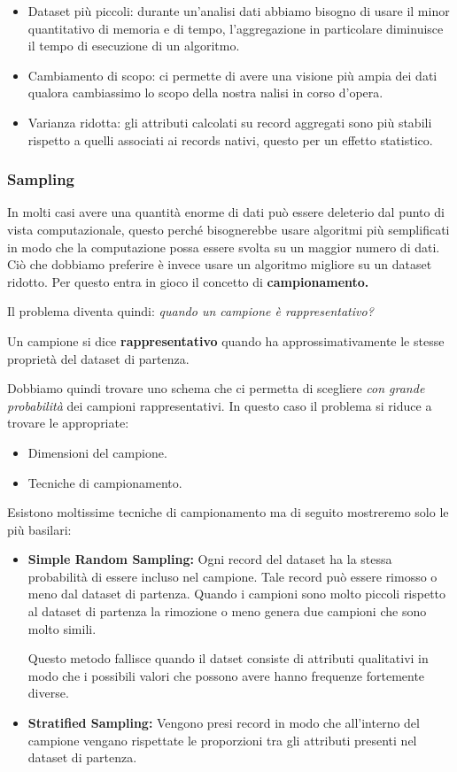 \begin{itemize}
	\item Dataset più piccoli: durante un'analisi dati abbiamo bisogno di usare il minor quantitativo di memoria e di tempo, l'aggregazione in particolare diminuisce il tempo di esecuzione di un algoritmo.
	\item Cambiamento di scopo: ci permette di avere una visione più ampia dei dati qualora cambiassimo lo scopo della nostra nalisi in corso d'opera.
	\item Varianza ridotta: gli attributi calcolati su record aggregati sono più stabili rispetto a quelli associati ai records nativi, questo per un effetto statistico.
\end{itemize}


\subsubsection{Sampling}
In molti casi avere una quantità enorme di dati può essere deleterio dal punto di vista computazionale, questo perché bisognerebbe usare algoritmi più semplificati in modo che la computazione possa essere svolta su un maggior numero di dati. Ciò che dobbiamo preferire è invece usare un algoritmo migliore su un dataset ridotto. Per questo entra in gioco il concetto di \textbf{campionamento.}

Il problema diventa quindi: \textit{quando un campione è rappresentativo?}

\begin{defn}
	Un campione si dice \textbf{rappresentativo} quando ha approssimativamente le stesse proprietà del dataset di partenza.

\end{defn}

Dobbiamo quindi trovare uno schema che ci permetta di scegliere \textit{con grande probabilità} dei campioni rappresentativi. In questo caso il problema si riduce a trovare le appropriate:
\begin{itemize}
	\item Dimensioni del campione.
	\item Tecniche di campionamento.
\end{itemize}
Esistono moltissime tecniche di campionamento ma di seguito  mostreremo solo le più basilari:

\begin{itemize}
	\item \textbf{Simple Random Sampling:} Ogni record del dataset ha la stessa probabilità di essere incluso nel campione. Tale record può essere rimosso o meno dal dataset di partenza. Quando i campioni sono molto piccoli rispetto al dataset di partenza la rimozione o meno genera due campioni che sono molto simili.
	
	Questo metodo fallisce quando il datset consiste di attributi qualitativi in modo che i possibili valori che possono avere hanno frequenze fortemente diverse.
	
	\item \textbf{Stratified Sampling:} Vengono presi record in modo che all'interno del campione vengano rispettate le proporzioni tra gli attributi presenti nel dataset di partenza.
\end{itemize}

